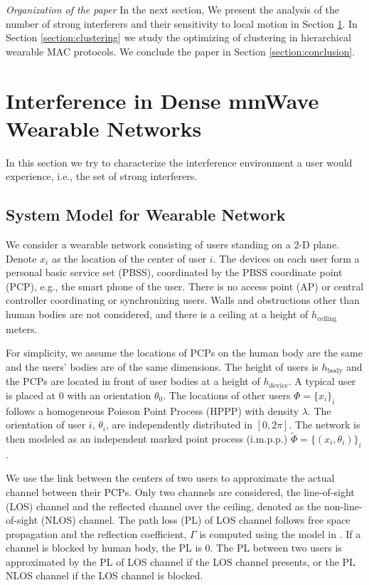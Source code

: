 \documentclass[10pt, conference, letterpaper]{IEEEtran}
\begin{document}
\emph{Organization of the paper}
In the next section, We present the analysis of the number of strong interferers and their sensitivity to local motion in Section \ref{section:interference}. 
In Section \ref{section:clustering} we study the optimizing of clustering in hierarchical wearable MAC protocols.
We conclude the paper in Section \ref{section:conclusion}.

\section{Interference in Dense mmWave Wearable Networks}\label{section:interference}
In this section we try to characterize the interference environment a user would experience, i.e., the set of strong interferers.

\subsection{System Model for Wearable Network}\label{section:channel:model}
We consider a wearable network consisting of users standing on a 2-D plane.
Denote $x_i$ as the location of the center of user $i$. 
The devices on each user form a personal basic service set (PBSS), coordinated by the PBSS coordinate point (PCP), e.g., the smart phone of the user.
There is no access point (AP) or central controller coordinating or synchronizing users.
Walls and obstructions other than human bodies are not considered, and there is a ceiling at a height of $h_{\mathrm{ceiling}}$ meters. 

For simplicity, we assume the locations of PCPs on the human body are the same and the users' bodies are of the same dimensions. 
The height of users is $h_{\mathrm{body}}$ and the PCPs are located in front of user bodies at a height of $h_{\mathrm{device}}$.
A typical user is placed at $0$ with an orientation $\theta_0$. The locations of other users $\Phi=\{x_i\}_i$ follows a homogeneous Poisson Point Process (HPPP) with density $\lambda$.
The orientation of user $i$, $\theta_i$, are independently distributed in $[0, 2\pi]$.
The network is then modeled as an independent marked point process (i.m.p.p.) $\tilde{\Phi}=\{(x_i, \theta_i)\}_i$. 

We use the link between the centers of two users to approximate the actual channel between their PCPs. 
Only two channels are considered, the line-of-sight (LOS) channel and the reflected channel over the ceiling, denoted as the non-line-of-sight (NLOS) channel.
The path loss (PL) of LOS channel follows free space propagation and the reflection coefficient, $\Gamma$ is computed using the model in \cite{reflection}.
If a channel is blocked by human body, the PL is 0.
The PL between two users is approximated by the PL of LOS channel if the LOS channel presents, or the PL NLOS channel if the LOS channel is blocked. 
\end{document}
